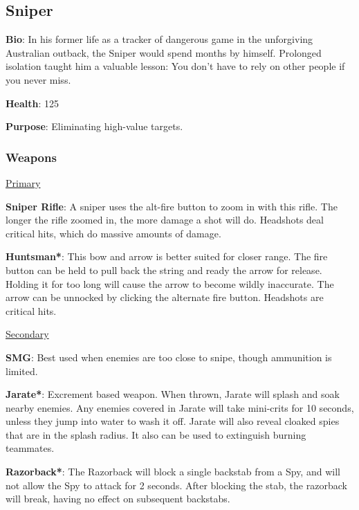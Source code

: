 \subsection{Sniper}
\label{Sniper}
{\bf Bio}:
In his former life as a tracker of dangerous game in the unforgiving Australian outback, the Sniper would spend months by himself. Prolonged isolation taught him a valuable lesson: You don't have to rely on other people if you never miss.

{\bf Health}: 125

{\bf Purpose}:
Eliminating high-value targets.

\subsubsection {Weapons}

\begin {center}
\underline {Primary}
\end {center}

{\bf Sniper Rifle}: A sniper uses the alt-fire button to zoom in with this rifle. The longer the rifle zoomed in, the more damage a shot will do. Headshots deal critical hits, which do massive amounts of damage.

{\bf Huntsman*}: This bow and arrow is better suited for closer range. The fire button can be held to pull back the string and ready the arrow for release. Holding it for too long will cause the arrow to become wildly inaccurate. The arrow can be unnocked by clicking the alternate fire button. Headshots are critical hits.

\begin {center}
\underline {Secondary}
\end {center}

{\bf SMG}: Best used when enemies are too close to snipe, though ammunition is limited.

{\bf Jarate*}: Excrement based weapon. When thrown, Jarate will splash and soak nearby enemies. Any enemies covered in Jarate will take mini-crits for 10 seconds, unless they jump into water to wash it off. Jarate will also reveal cloaked spies that are in the splash radius. It also can be used to extinguish burning teammates. 

{\bf Razorback*}: The Razorback will block a single backstab from a Spy, and will not allow the Spy to attack for 2 seconds. After blocking the stab, the razorback will break, having no effect on subsequent backstabs.

\newpage

